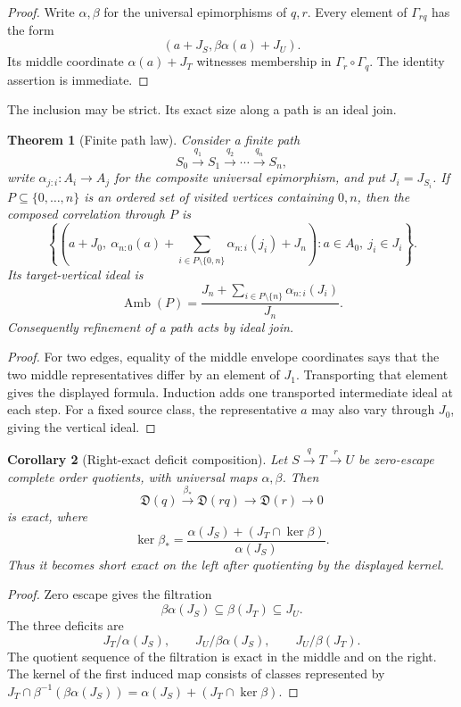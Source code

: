 \documentclass[11pt,a4paper]{amsart}
\theoremstyle{plain}
\newtheorem{theorem}{Theorem}[section]
\newtheorem{corollary}[theorem]{Corollary}
\theoremstyle{definition}
\newcommand{\Def}{\mathfrak D}
\begin{document}
\begin{proof}
Write $\alpha,\beta$ for the universal epimorphisms of $q,r$.  Every element of
$\Gamma_{rq}$ has the form
\[
 (a+J_S,\beta\alpha(a)+J_U).
\]
Its middle coordinate $\alpha(a)+J_T$ witnesses membership in
$\Gamma_r\circ\Gamma_q$.  The identity assertion is immediate.
\end{proof}

The inclusion may be strict.  Its exact size along a path is an ideal join.

\begin{theorem}[Finite path law]\label{thm:pathjoin}
Consider a finite path
\[
 S_0\xrightarrow{q_1}S_1\xrightarrow{q_2}\cdots\xrightarrow{q_n}S_n,
\]
write $\alpha_{j:i}:A_i\to A_j$ for the composite universal epimorphism, and put
$J_i=J_{S_i}$.  If $P\subseteq\{0,\ldots,n\}$ is an ordered set of visited vertices containing
$0,n$, then the composed correlation through $P$ is
\[
 \left\{\left(a+J_0,\
 \alpha_{n:0}(a)+
 \sum_{i\in P\setminus\{0,n\}}\alpha_{n:i}(j_i)+J_n\right):
 a\in A_0,\ j_i\in J_i\right\}.
\]
Its target-vertical ideal is
\[
 \boxed{\operatorname{Amb}(P)=
 \frac{J_n+\sum_{i\in P\setminus\{n\}}\alpha_{n:i}(J_i)}{J_n}.}
\]
Consequently refinement of a path acts by ideal join.
\end{theorem}

\begin{proof}
For two edges, equality of the middle envelope coordinates says that the two middle
representatives differ by an element of $J_1$.  Transporting that element gives the displayed
formula.  Induction adds one transported intermediate ideal at each step.  For a fixed source
class, the representative $a$ may also vary through $J_0$, giving the vertical ideal.
\end{proof}

\begin{corollary}[Right-exact deficit composition]\label{cor:defcomp}
Let \(S\xrightarrow{q}T\xrightarrow{r}U\) be zero-escape complete order quotients, with universal
maps \(\alpha,\beta\).  Then
\[
 \Def(q)\xrightarrow{\beta_*}\Def(rq)\longrightarrow\Def(r)\longrightarrow0
\]
is exact, where
\[
 \ker\beta_*=
 \frac{\alpha(J_S)+(J_T\cap\ker\beta)}{\alpha(J_S)}.
\]
Thus it becomes short exact on the left after quotienting by the displayed kernel.
\end{corollary}

\begin{proof}
Zero escape gives the filtration
\[
 \beta\alpha(J_S)\subseteq\beta(J_T)\subseteq J_U.
\]
The three deficits are
\[
 J_T/\alpha(J_S),\qquad J_U/\beta\alpha(J_S),\qquad J_U/\beta(J_T).
\]
The quotient sequence of the filtration is exact in the middle and on the right.  The kernel of
the first induced map consists of classes represented by
\(J_T\cap\beta^{-1}(\beta\alpha(J_S))=
\alpha(J_S)+(J_T\cap\ker\beta)\).
\end{proof}
\end{document}
